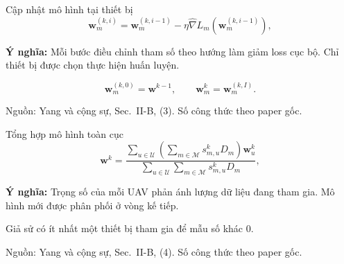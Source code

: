 \documentclass[10pt,aspectratio=43]{beamer}
\newcommand{\source}[1]{\par\vfill{\fontsize{5.8}{7}\selectfont\color{Muted}Nguồn: #1\par}}
\newcommand{\paperref}[1]{\source{Yang và cộng sự, Sec.~#1. Số công thức theo paper gốc.}}
\newcommand{\eqmeaning}[1]{\par\medskip\textcolor{HustRed}{\textbf{Ý nghĩa:}} #1\par}
\newcommand{\noteonly}[1]{\par{\footnotesize\color{Muted}#1\par}}
\begin{document}
\begin{frame}[t]{Cập nhật mô hình tại thiết bị}
\relax
\begin{equation}\mathbf w_m^{(k,i)}=\mathbf w_m^{(k,i-1)}-\eta\widehat\nabla L_m(\mathbf w_m^{(k,i-1)}),\tag{3}\end{equation}\par{}\eqmeaning{Mỗi bước điều chỉnh tham số theo hướng làm giảm loss cục bộ. Chỉ thiết bị được chọn thực hiện huấn luyện.}
\[\mathbf w_m^{(k,0)}=\mathbf w^{k-1},\qquad \mathbf w_m^k=\mathbf w_m^{(k,I)}.\]
\paperref{II-B, (3)}
\end{frame}

\begin{frame}[t]{Tổng hợp mô hình toàn cục}
\relax
\begin{equation}\mathbf w^k=\frac{\sum_{u\in\mathcal U}(\sum_{m\in\mathcal M}s_{m,u}^kD_m)\mathbf w_u^k}{\sum_{u\in\mathcal U}\sum_{m\in\mathcal M}s_{m,u}^kD_m},\tag{4}\end{equation}\par{}\eqmeaning{Trọng số của mỗi UAV phản ánh lượng dữ liệu đang tham gia. Mô hình mới được phân phối ở vòng kế tiếp.}
\noteonly{Giả sử có ít nhất một thiết bị tham gia để mẫu số khác 0.}
\paperref{II-B, (4)}
\end{frame}
\end{document}
